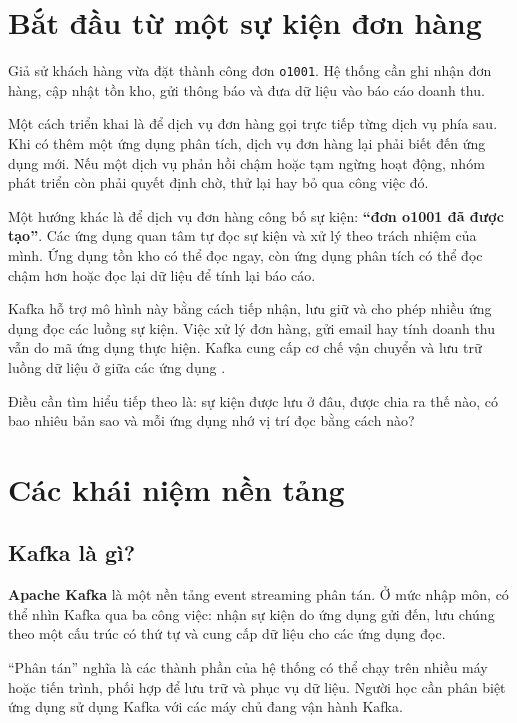 \endgroup
\clearpage
\tableofcontents
\clearpage

\FloatBarrier
{}
\section{Bắt đầu từ một sự kiện đơn hàng}

Giả sử khách hàng vừa đặt thành công đơn \texttt{o1001}. Hệ thống cần ghi nhận đơn hàng, cập nhật tồn kho, gửi thông báo và đưa dữ liệu vào báo cáo doanh thu.


Một cách triển khai là để dịch vụ đơn hàng gọi trực tiếp từng dịch vụ phía sau. Khi có thêm một ứng dụng phân tích, dịch vụ đơn hàng lại phải biết đến ứng dụng mới. Nếu một dịch vụ phản hồi chậm hoặc tạm ngừng hoạt động, nhóm phát triển còn phải quyết định chờ, thử lại hay bỏ qua công việc đó.


Một hướng khác là để dịch vụ đơn hàng công bố sự kiện: \textbf{“đơn o1001 đã được tạo”}. Các ứng dụng quan tâm tự đọc sự kiện và xử lý theo trách nhiệm của mình. Ứng dụng tồn kho có thể đọc ngay, còn ứng dụng phân tích có thể đọc chậm hơn hoặc đọc lại dữ liệu để tính lại báo cáo.


Kafka hỗ trợ mô hình này bằng cách tiếp nhận, lưu giữ và cho phép nhiều ứng dụng đọc các luồng sự kiện. Việc xử lý đơn hàng, gửi email hay tính doanh thu vẫn do mã ứng dụng thực hiện. Kafka cung cấp cơ chế vận chuyển và lưu trữ luồng dữ liệu ở giữa các ứng dụng \cite{kafka-intro}.


Điều cần tìm hiểu tiếp theo là: sự kiện được lưu ở đâu, được chia ra thế nào, có bao nhiêu bản sao và mỗi ứng dụng nhớ vị trí đọc bằng cách nào?


\FloatBarrier
{}
\section{Các khái niệm nền tảng}

\FloatBarrier
{}
\subsection{Kafka là gì?}

\textbf{Apache Kafka} là một nền tảng event streaming phân tán. Ở mức nhập môn, có thể nhìn Kafka qua ba công việc: nhận sự kiện do ứng dụng gửi đến, lưu chúng theo một cấu trúc có thứ tự và cung cấp dữ liệu cho các ứng dụng đọc.


“Phân tán” nghĩa là các thành phần của hệ thống có thể chạy trên nhiều máy hoặc tiến trình, phối hợp để lưu trữ và phục vụ dữ liệu. Người học cần phân biệt ứng dụng sử dụng Kafka với các máy chủ đang vận hành Kafka.


